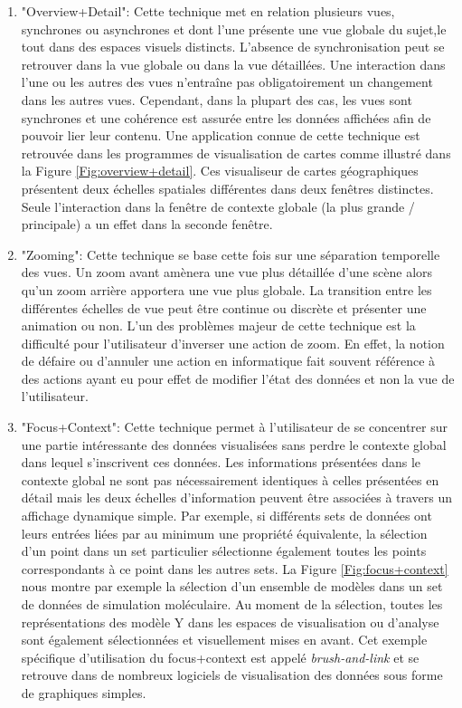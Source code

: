 \begin{enumerate}
    \item "Overview+Detail": Cette technique met en relation plusieurs vues, synchrones ou asynchrones et dont l'une présente une vue globale du sujet,le tout dans des espaces visuels distincts. L'absence de synchronisation peut se retrouver dans la vue globale ou dans la vue détaillées. Une interaction dans l'une ou les autres des vues n'entraîne pas obligatoirement un changement dans les autres vues. Cependant, dans la plupart des cas, les vues sont synchrones et une cohérence est assurée entre les données affichées afin de pouvoir lier leur contenu. Une application connue de cette technique est retrouvée dans les programmes de visualisation de cartes comme illustré dans la Figure \ref{Fig:overview+detail}. Ces visualiseur de cartes géographiques présentent deux échelles spatiales différentes dans deux fenêtres distinctes. Seule l'interaction dans la fenêtre de contexte globale (la plus grande / principale) a un effet dans la seconde fenêtre.
    \item "Zooming": Cette technique se base cette fois sur une séparation temporelle des vues. Un zoom avant amènera une vue plus détaillée d'une scène alors qu'un zoom arrière apportera une vue plus globale. La transition entre les différentes échelles de vue peut être continue ou discrète et présenter une animation ou non. L'un des problèmes majeur de cette technique est la difficulté pour l'utilisateur d'inverser une action de zoom. En effet, la notion de défaire ou d'annuler une action en informatique fait souvent référence à des actions ayant eu pour effet de modifier l'état des données et non la vue de l'utilisateur.
    \item "Focus+Context": Cette technique permet à l'utilisateur de se concentrer sur une partie intéressante des données visualisées sans perdre le contexte global dans lequel s'inscrivent ces données. Les informations présentées dans le contexte global ne sont pas nécessairement identiques à celles présentées en détail mais les deux échelles d'information peuvent être associées à travers un affichage dynamique simple. Par exemple, si différents sets de données ont leurs entrées liées par au minimum une propriété équivalente, la sélection d'un point dans un set particulier sélectionne également toutes les points correspondants à ce point dans les autres sets. La Figure \ref{Fig:focus+context} nous montre par exemple la sélection d'un ensemble de modèles dans un set de données de simulation moléculaire. Au moment de la sélection, toutes les représentations des modèle Y dans les espaces de visualisation ou d'analyse sont également sélectionnées et visuellement mises en avant. Cet exemple spécifique d'utilisation du focus+context est appelé \textit{brush-and-link} et se retrouve dans de nombreux logiciels de visualisation des données sous forme de graphiques simples.

\end{enumerate}
